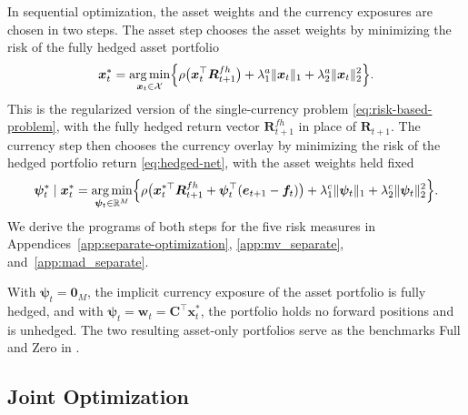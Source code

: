 In sequential optimization, the asset weights and the currency exposures are chosen in two steps. The asset step chooses
the asset weights by minimizing the risk of the fully hedged asset portfolio
\begin{equation}\label{eq:sequential-asset}
    \bm{x}_t^* = \operatorname*{arg\,min}_{\bm{x}_t \in \mathcal{X}} \Bigl\{ \rho\bigl( \bm{x}_t^\top \bm{R}^{fh}_{t+1} \bigr)
    + \lambda_1^a \|\bm{x}_t\|_1 + \lambda_2^a \|\bm{x}_t\|_2^2 \Bigr\}.
\end{equation}
This is the regularized version of the single-currency problem \eqref{eq:risk-based-problem}, with the fully hedged
return vector $\bm{R}^{fh}_{t+1}$ in place of $\bm{R}_{t+1}$.
The currency step then chooses the currency overlay by minimizing the risk of the hedged portfolio return
\eqref{eq:hedged-net}, with the asset weights held fixed
\begin{equation}\label{eq:sequential-currency}
    \bm{\psi}_t^* \mid \bm{x}_t^* = \operatorname*{arg\,min}_{\bm{\psi}_t \in \mathbb{R}^M} \Bigl\{ \rho\bigl( \bm{x}_t^{*\top} \bm{R}^{fh}_{t+1}
    + \bm{\psi}_t^\top (\bm{e}_{t+1} - \bm{f}_t) \bigr) + \lambda_1^c \|\bm{\psi}_t\|_1 + \lambda_2^c \|\bm{\psi}_t\|_2^2
    \Bigr\}.
\end{equation}
We derive the programs of both steps for the five risk measures in
Appendices~\ref{app:separate-optimization}, \ref{app:mv_separate}, and~\ref{app:mad_separate}.

With $\bm{\psi}_t = \bm{0}_M$, the implicit currency
exposure of the asset portfolio is fully hedged, and with $\bm{\psi}_t = \bm{w}_t = \bm{C}^\top \bm{x}_t^*$, the
portfolio holds no forward positions and is unhedged. The two resulting asset-only portfolios serve as the benchmarks
Full and Zero in .

\subsection{Joint Optimization}\label{sec:joint-optimization}

